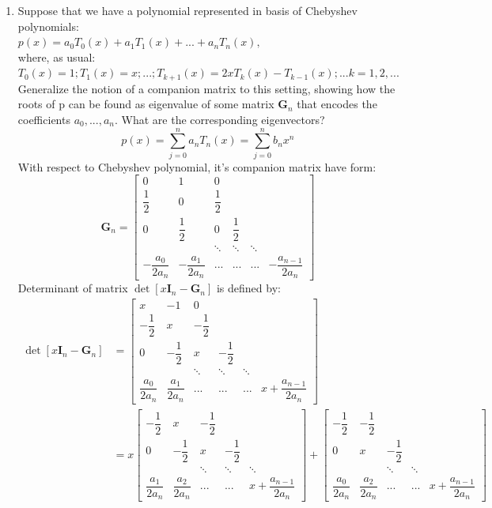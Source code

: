 \documentclass[14pt,a4paper]{article}
\begin{document}
\begin{enumerate}
	\label{5d}
	\item Suppose that we have a polynomial represented in basis of Chebyshev polynomials:\\
	\hspace*{4cm} $ p(x) = a_0T_0(x) + a_1T_1(x) + ... + a_nT_n(x), $\\
	where, as usual: $T_0(x) = 1; T_1(x) = x; ... ; T_{k+1}(x) = 2xT_k(x) - T_{k-1}(x); ... k = 1,2, ...$ \\
	Generalize the notion of a companion matrix to this setting, showing how the roots of p can be found as eigenvalue of some matrix $\textbf{G}_n$ that encodes the coefficients $a_0, . . . , a_n$. What are the corresponding eigenvectors? 
	$$p(x) = \sum_{j=0}^{n}a_nT_n(x) = \sum_{j=0}^{n}b_nx^n$$
	With respect to Chebyshev polynomial, it's companion matrix have form:
	$$\textbf{G}_n = \begin{bmatrix} 0& 1&0 & \\ \dfrac{1}{2} & 0 & \dfrac{1}{2} & \\ 0& \dfrac{1}{2} & 0 &\dfrac{1}{2} & \\ & & \ddots & \ddots & \ddots \\ -\dfrac{a_0}{2a_n} & -\dfrac{a_1}{2a_n} & ... &...&...& -\dfrac{a_{n-1}}{2a_n} \end{bmatrix}$$
	 Determinant of matrix $\det[x\textbf{I}_n - \textbf{G}_n]$ is defined by:
	 \begin{align*} \det[x\textbf{I}_n - \textbf{G}_n] &= \begin{bmatrix} x& -1&0 & \\ -\dfrac{1}{2} & x & -\dfrac{1}{2} & \\ 0& -\dfrac{1}{2} & x &-\dfrac{1}{2} & \\ & & \ddots & \ddots & \ddots \\ \dfrac{a_0}{2a_n} & \dfrac{a_1}{2a_n} & ... &...&...& x+\dfrac{a_{n-1}}{2a_n} \end{bmatrix}\\
	 &= x\begin{bmatrix} -\dfrac{1}{2} & x & -\dfrac{1}{2} & \\ 0& -\dfrac{1}{2} & x &-\dfrac{1}{2} & \\ & & \ddots & \ddots & \ddots \\ \dfrac{a_1}{2a_n} & \dfrac{a_2}{2a_n} &...&...& x+\dfrac{a_{n-1}}{2a_n} \end{bmatrix} + \begin{bmatrix} -\dfrac{1}{2} & -\dfrac{1}{2} & \\ 0& x &-\dfrac{1}{2} & \\ & & \ddots & \ddots & \\ \dfrac{a_0}{2a_n} & \dfrac{a_2}{2a_n} & ...&...& x+\dfrac{a_{n-1}}{2a_n} \end{bmatrix}

\end{align*}
\end{enumerate}
\end{document}
